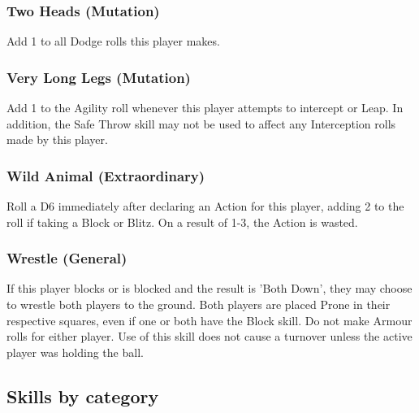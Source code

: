 \documentclass{article}
\begin{document}
\begin{multicols}{3}
\subsubsection{Two Heads (Mutation)}
\par Add 1 to all Dodge rolls this player makes.

\subsubsection{Very Long Legs (Mutation)}
\par Add 1 to the Agility roll whenever this player attempts to intercept or Leap. In addition, the Safe Throw skill may not be used to affect any Interception rolls made by this player.

\subsubsection{Wild Animal (Extraordinary)}
\par Roll a D6 immediately after declaring an Action for this player, adding 2 to the roll if taking a Block or Blitz. On a result of 1-3,  the Action is wasted.

\subsubsection{Wrestle (General)}
\par If this player blocks or is blocked and the result is 'Both Down', they may choose to wrestle both players to the ground. Both players are placed Prone in their respective squares, even if one or both have the Block skill. Do not make Armour rolls for either player. Use of this skill does not cause a turnover unless the active player was holding the ball.

\end{multicols}

\subsection{Skills by category}
\end{document}
